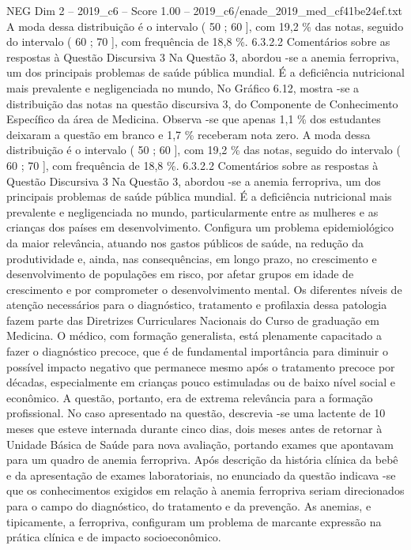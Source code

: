 \begin{textsample}{NEG Dim 2 – 2019\_c6 – Score 1.00 – 2019\_c6/enade\_2019\_med\_cf41be24ef.txt}
A moda dessa distribuição é o intervalo ( 50 ; 60 ], com 19,2 \% das notas, seguido do intervalo ( 60 ; 70 ], com frequência de 18,8 \%. 6.3.2.2 Comentários sobre as respostas à Questão Discursiva 3 Na Questão 3, abordou -se a anemia ferropriva, um dos principais problemas de saúde pública mundial.
É a deficiência nutricional mais prevalente e negligenciada no mundo, No Gráfico 6.12, mostra -se a distribuição das notas na questão discursiva 3, do Componente de Conhecimento Específico da área de Medicina.
Observa -se que apenas 1,1 \% dos estudantes deixaram a questão em branco e 1,7 \% receberam nota zero.
A moda dessa distribuição é o intervalo ( 50 ; 60 ], com 19,2 \% das notas, seguido do intervalo ( 60 ; 70 ], com frequência de 18,8 \%. 6.3.2.2 Comentários sobre as respostas à Questão Discursiva 3 Na Questão 3, abordou -se a anemia ferropriva, um dos principais problemas de saúde pública mundial.
É a deficiência nutricional mais prevalente e negligenciada no mundo, particularmente entre as mulheres e as crianças dos países em desenvolvimento.
Configura um problema epidemiológico da maior relevância, atuando nos gastos públicos de saúde, na redução da produtividade e, ainda, nas consequências, em longo prazo, no crescimento e desenvolvimento de populações em risco, por afetar grupos em idade de crescimento e por comprometer o desenvolvimento mental.
Os diferentes níveis de atenção necessários para o diagnóstico, tratamento e profilaxia dessa patologia fazem parte das Diretrizes Curriculares Nacionais do Curso de graduação em Medicina.
O médico, com formação generalista, está plenamente capacitado a fazer o diagnóstico precoce, que é de fundamental importância para diminuir o possível impacto negativo que permanece mesmo após o tratamento precoce por décadas, especialmente em crianças pouco estimuladas ou de baixo nível social e econômico.
A questão, portanto, era de extrema relevância para a formação profissional.
No caso apresentado na questão, descrevia -se uma lactente de 10 meses que esteve internada durante cinco dias, dois meses antes de retornar à Unidade Básica de Saúde para nova avaliação, portando exames que apontavam para um quadro de anemia ferropriva.
Após descrição da história clínica da bebê e da apresentação de exames laboratoriais, no enunciado da questão indicava -se que os conhecimentos exigidos em relação à anemia ferropriva seriam direcionados para o campo do diagnóstico, do tratamento e da prevenção.
As anemias, e tipicamente, a ferropriva, configuram um problema de marcante expressão na prática clínica e de impacto socioeconômico.

\end{textsample}
